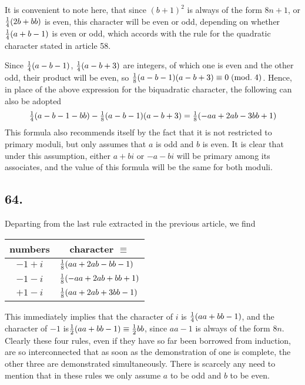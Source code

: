 \documentclass[twoside,12pt]{memoir}
\renewcommand{\pmod}[1]{\;(\textrm{mod.}\;#1)}
\let\oldfrac\frac
\def\frac#1#2{\mathchoice{\tfrac{#1}{#2}}{\oldfrac{#1}{#2}}{\genfrac{}{}{}{2}{#1}{#2\mathstrut}}{\genfrac{}{}{}{3}{#1}{#2\mathstrut}}}
\begin{document}
It is convenient to note here, that since \((b+1)^{2}\) is always of the form \(8 n+1\), or \(\frac{1}{4}(2 b+b b)\) is even, this character will be even or odd, depending on whether \(\frac{1}{4}(a+b-1)\) is even or odd, which accords with the rule for the quadratic character stated in article 58.

Since \(\frac{1}{4}(a-b-1)\), \(\frac{1}{4}(a-b+3)\) are integers, of which one is even and the other odd, their product will be even, so \(\frac{1}{8}(a-b-1)(a-b+3) \equiv 0\pmod{4}\). Hence, in place of the above expression for the biquadratic character, the following can also be adopted
\[\frac{1}{4}(a-b-1-b b)-\frac{1}{8}(a-b-1)(a-b+3)=\frac{1}{8}(-a a+2 a b-3 b b+1)\]
This formula also recommends itself by the fact that it is not restricted to primary moduli, but only assumes that \(a\) is odd and \(b\) is even.  It is clear that under this assumption, either \(a+b i\) or \(-a-b i\) will be primary among its associates, and the value of this formula will be the same for both moduli.\pagebreak%

\subsection*{64.}

Departing from the last rule extracted in the previous article, we find 
\begin{center}
\begin{tabular}{c|l}
numbers & \multicolumn{1}{c}{character \(\equiv\)} \\
\hline
\(-1+i\) & \(\frac{1}{8}(a a+2 a b-b b-1)\) \\
\(-1-i\) & \(\frac{1}{8}(-a a+2 a b+b b+1)\) \\
\(+1-i\) & \(\frac{1}{8}(a a+2 a b+3 b b-1)\) \\
\end{tabular}
\end{center}
This immediately implies that the character of \(i\) is \(\frac{1}{4}(a a+b b-1)\), and the character of \(-1\) is\(\frac{1}{2}(a a+b b-1) \equiv \frac{1}{2} b b\), since \(a a-1\) is always of the form \(8n\). Clearly these four rules, even if they have so far been borrowed from induction, are so interconnected that as soon as the demonstration of one is complete, the other three are demonstrated simultaneously. There is scarcely any need to mention that in these rules we only assume \(a\) to be odd and \(b\) to be even.
\end{document}
